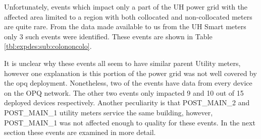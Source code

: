 Unfortunately, events which impact only a part of the UH power grid with the affected area limited to a region with both collocated and non-collocated meters are quite rare.
From the data made available to us from the UH Smart meters only 3 such events were identified.
These events are shown in Table \ref{tbl:expdes:sub:colononcolo}.

It is unclear why these events all seem to have similar parent Utility meters, however one explanation is this portion of the power grid was not well covered by the opq deployment.
Nonetheless, two of the events have data from every device on the OPQ network.
The other two events only impacted 9 and 10 out of 15 deployed devices respectively.
Another peculiarity is that POST\_MAIN\_2 and POST\_MAIN\_1 utility meters service the same building, however, POST\_MAIN\_1 was not affected enough to quality for these events.
In the next section these events are examined in more detail.
